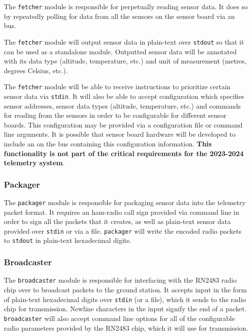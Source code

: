 The \texttt{fetcher} module is responsible for perpetually reading sensor data. It does so by repeatedly polling for
data from all the sensors on the   sensor board via an  bus.

The \texttt{fetcher} module will output sensor data in plain-text over \texttt{\gls{stdout}} so that it can be used as
a standalone module. Outputted sensor data will be annotated with its data type (altitude, temperature, etc.) and unit
of measurement (metres, degrees Celsius, etc.).

The \texttt{fetcher} module will be able to receive instructions to prioritize certain sensor data via
\texttt{\gls{stdin}}. It will also be able to accept configuration which specifies sensor addresses, sensor data types
(altitude, temperature, etc.) and commands for reading from the sensors in order to be configurable for different
 sensor boards. This configuration may be provided via a configuration file or command line
arguments. It is possible that sensor board hardware will be developed to include an  on the
 bus containing this configuration information. \textbf{This functionality is not part of the critical
    requirements for the 2023-2024 telemetry system}.

\subsubsection{Packager}

The \texttt{packager} module is responsible for packaging sensor data into the  telemetry packet
format. It requires an \gls{ham-radio} call sign provided via command line in order to sign all the packets that it
creates, as well as plain-text sensor data provided over \texttt{\gls{stdin}} or via a file. \texttt{packager} will
write the encoded radio packets to \texttt{\gls{stdout}} in plain-text hexadecimal digits.

\subsubsection{Broadcaster}

The \texttt{broadcaster} module is responsible for interfacing with the  RN2483 radio chip over
 to broadcast packets to the ground station. It accepts input in the form of plain-text hexadecimal
digits over \texttt{\gls{stdin}} (or a file), which it sends to the radio chip for transmission. Newline characters in
the input signify the end of a packet. \texttt{broadcaster} will also accept command line options for all of the
configurable radio parameters provided by the RN2483 chip, which it will use for transmission.


